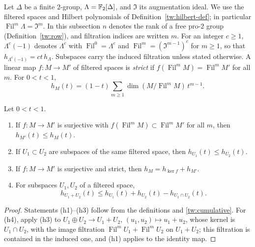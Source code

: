 Let $\Delta$ be a finite $2$-group, $\Lambda=\mathbb F_2[\Delta]$, and
$\mathfrak I$ its augmentation ideal. We use the filtered spaces and Hilbert
polynomials of Definition~\ref{tw:hilbert-def}; in particular
$\operatorname{Fil}^m\Lambda=\mathfrak I^m$. In this subsection $n$ denotes
the rank of a free pro-$2$ group (Definition~\ref{tw:row}), and filtration
indices are written $m$. For an integer $c\ge1$, $\Lambda^c(-1)$ denotes
$\Lambda^c$ with $\operatorname{Fil}^0=\Lambda^c$ and
$\operatorname{Fil}^m=(\mathfrak I^{m-1})^c$ for $m\ge1$, so that
$h_{\Lambda^c(-1)}=ct\,h_\Lambda$. Subspaces carry the induced filtration
unless stated otherwise. A linear map $f\colon M\to M'$ of filtered spaces is
\emph{strict} if $f(\operatorname{Fil}^mM)=\operatorname{Fil}^mM'$ for all
$m$. For $0<t<1$,
\begin{equation}\label{tw:cumulative}
 h_M(t)=(1-t)\sum_{m\ge1}\dim(M/\operatorname{Fil}^mM)\,t^{m-1}.
\end{equation}

\begin{lemma}\label{tw:hilbert-properties}
Let $0<t<1$.
\begin{enumerate}
\item[(h1)] If $f\colon M\to M'$ is surjective with
 $f(\operatorname{Fil}^mM)\subset\operatorname{Fil}^mM'$ for all $m$, then
 $h_{M'}(t)\le h_M(t)$.
\item[(h2)] If $U_1\subset U_2$ are subspaces of the same filtered space,
 then $h_{U_1}(t)\le h_{U_2}(t)$.
\item[(h3)] If $f\colon M\to M'$ is surjective and strict, then
 $h_M=h_{\ker f}+h_{M'}$.
\item[(h4)] For subspaces $U_1,U_2$ of a filtered space,
 \begin{equation}\label{tw:filtered-sum}
  h_{U_1+U_2}(t)\le h_{U_1}(t)+h_{U_2}(t)-h_{U_1\cap U_2}(t).
 \end{equation}
\end{enumerate}
\end{lemma}

\begin{proof}
Statements (h1)--(h3) follow from the definitions and \eqref{tw:cumulative}.
For (h4), apply (h3) to $U_1\oplus U_2\to U_1+U_2$, $(u_1,u_2)\mapsto u_1+u_2$,
whose kernel is $U_1\cap U_2$, with the image filtration
$\operatorname{Fil}^mU_1+\operatorname{Fil}^mU_2$ on
$U_1+U_2$; this filtration is contained in the induced one, and (h1) applies
to the identity map.
\end{proof}

